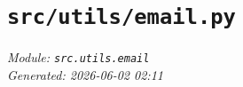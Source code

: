 
\section{\texttt{src/utils/email.py}}
\textit{Module: \texttt{src.utils.email}} \\
\textit{Generated: 2026-06-02 02:11} \\
